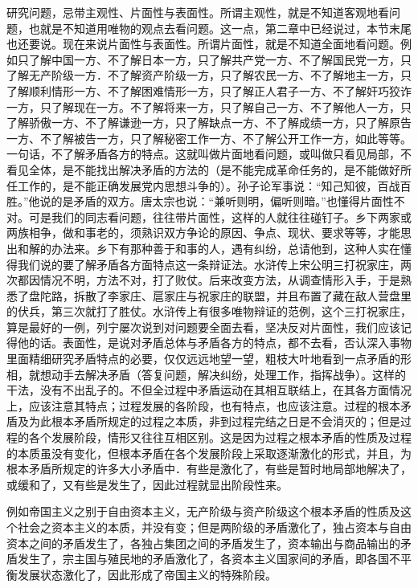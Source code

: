 \documentclass[UTF8, 12pt, a4paper]{ctexrep}
\begin{document}
研究问题，忌带主观性、片面性与表面性。所谓主观性，就是不知道客观地看问题，也就是不知道用唯物的观点去看问题。这一点，第二章中已经说过，本节末尾也还要说。现在来说片面性与表面性。所谓片面性，就是不知道全面地看问题。例如只了解中国一方、不了解日本一方，只了解共产党一方、不了解国民党一方，只了解无产阶级一方．不了解资产阶级一方，只了解农民一方、不了解地主一方，只了解顺利情形一方、不了解困难情形一方，只了解正人君子一方、不了解奸巧狡诈一方，只了解现在一方。不了解将来一方，只了解自己一方、不了解他人一方，只了解骄傲一方、不了解谦逊一方，只了解缺点一方、不了解成绩一方，只了解原告一方、不了解被告一方，只了解秘密工作一方、不了解公开工作一方，如此等等。一句话，不了解矛盾各方的特点。这就叫做片面地看问题，或叫做只看见局部，不看见全体，是不能找出解决矛盾的方法的（是不能完成革命任务的，是不能做好所任工作的，是不能正确发展党内思想斗争的）。孙子论军事说：“知己知彼，百战百胜。”他说的是矛盾的双方。唐太宗也说：“兼听则明，偏听则暗。”也懂得片面性不对。可是我们的同志看问题，往往带片面性，这样的人就往往碰钉子。乡下两家或两族相争，做和事老的，须熟识双方争论的原因、争点、现状、要求等等，才能思出和解的办法来。乡下有那种善于和事的人，遇有纠纷，总请他到，这种人实在懂得我们说的要了解矛盾各方面特点这一条辩证法。水浒传上宋公明三打祝家庄，两次都因情况不明，方法不对，打了败仗。后来改变方法，从调查情形入手，于是熟悉了盘陀路，拆散了李家庄、扈家庄与祝家庄的联盟，并且布置了藏在敌人营盘里的伏兵，第三次就打了胜仗。水浒传上有很多唯物辩证的范例，这个三打祝家庄，算是最好的一例，列宁屡次说到对问题要全面去看，坚决反对片面性，我们应该记得他的话。表面性，是说对矛盾总体与矛盾各方的特点，都不去看，否认深入事物里面精细研究矛盾特点的必要，仅仅远远地望一望，粗枝大叶地看到一点矛盾的形相，就想动手去解决矛盾（答复问题，解决纠纷，处理工作，指挥战争）。这样的干法，没有不出乱子的。不但全过程中矛盾运动在其相互联结上，在其各方面情况上，应该注意其特点；过程发展的各阶段，也有特点，也应该注意。过程的根本矛盾及为此根本矛盾所规定的过程之本质，非到过程完结之日是不会消灭的；但是过程的各个发展阶段，情形又往往互相区别。这是因为过程之根本矛盾的性质及过程的本质虽没有变化，但根本矛盾在各个发展阶段上采取逐渐激化的形式，并且，为根本矛盾所规定的许多大小矛盾中．有些是激化了，有些是暂时地局部地解决了，或缓和了，又有些是发生了，因此过程就显出阶段性来。

例如帝国主义之别于自由资本主义，无产阶级与资产阶级这个根本矛盾的性质及这个社会之资本主义的本质，并没有变；但是两阶级的矛盾激化了，独占资本与自由资本之间的矛盾发生了，各独占集团之间的矛盾发生了，资本输出与商品输出的矛盾发生了，宗主国与殖民地的矛盾激化了，各资本主义国家间的矛盾，即各国不平衡发展状态激化了，因此形成了帝国主义的特殊阶段。
\end{document}
